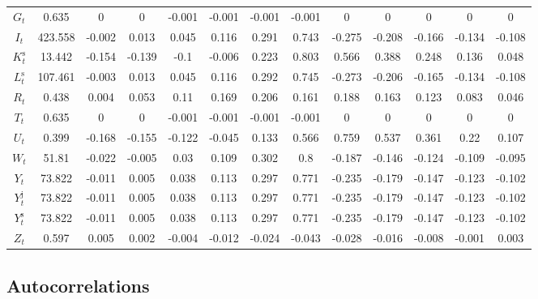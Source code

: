 \begin{tabular}{c|c|c|c|c|c|c|c|c|c|c|c|c|}
$G_{t}$ & 0.635 & 0 & 0 & -0.001 & -0.001 & -0.001 & -0.001 & 0 & 0 & 0 & 0 & 0 \\
$I_{t}$ & 423.558 & -0.002 & 0.013 & 0.045 & 0.116 & 0.291 & 0.743 & -0.275 & -0.208 & -0.166 & -0.134 & -0.108 \\
$K^{\mathrm{s}}_{t}$ & 13.442 & -0.154 & -0.139 & -0.1 & -0.006 & 0.223 & 0.803 & 0.566 & 0.388 & 0.248 & 0.136 & 0.048 \\
$L^{\mathrm{s}}_{t}$ & 107.461 & -0.003 & 0.013 & 0.045 & 0.116 & 0.292 & 0.745 & -0.273 & -0.206 & -0.165 & -0.134 & -0.108 \\
$R_{t}$ & 0.438 & 0.004 & 0.053 & 0.11 & 0.169 & 0.206 & 0.161 & 0.188 & 0.163 & 0.123 & 0.083 & 0.046 \\
$T_{t}$ & 0.635 & 0 & 0 & -0.001 & -0.001 & -0.001 & -0.001 & 0 & 0 & 0 & 0 & 0 \\
$U_{t}$ & 0.399 & -0.168 & -0.155 & -0.122 & -0.045 & 0.133 & 0.566 & 0.759 & 0.537 & 0.361 & 0.22 & 0.107 \\
$W_{t}$ & 51.81 & -0.022 & -0.005 & 0.03 & 0.109 & 0.302 & 0.8 & -0.187 & -0.146 & -0.124 & -0.109 & -0.095 \\
$Y_{t}$ & 73.822 & -0.011 & 0.005 & 0.038 & 0.113 & 0.297 & 0.771 & -0.235 & -0.179 & -0.147 & -0.123 & -0.102 \\
$Y^{\mathrm{j}}_{t}$ & 73.822 & -0.011 & 0.005 & 0.038 & 0.113 & 0.297 & 0.771 & -0.235 & -0.179 & -0.147 & -0.123 & -0.102 \\
$Y^{\mathrm{s}}_{t}$ & 73.822 & -0.011 & 0.005 & 0.038 & 0.113 & 0.297 & 0.771 & -0.235 & -0.179 & -0.147 & -0.123 & -0.102 \\
$Z_{t}$ & 0.597 & 0.005 & 0.002 & -0.004 & -0.012 & -0.024 & -0.043 & -0.028 & -0.016 & -0.008 & -0.001 & 0.003 \\
\hline
\end{tabular}


\subsection{Autocorrelations}

